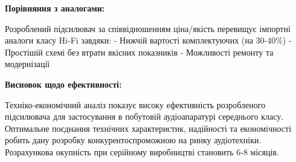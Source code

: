 \documentclass[main.tex]{subfiles}
\begin{document}
\textbf{Порівняння з аналогами:}

Розроблений підсилювач за співвідношенням ціна/якість перевищує імпортні аналоги класу Hi-Fi завдяки:
- Нижчій вартості комплектуючих (на 30-40\%)
- Простішій схемі без втрати якісних показників
- Можливості ремонту та модернізації

\textbf{Висновок щодо ефективності:}

Техніко-економічний аналіз показує високу ефективність розробленого підсилювача для застосування в побутовій аудіоапаратурі середнього класу. Оптимальне поєднання технічних характеристик, надійності та економічності робить дану розробку конкурентоспроможною на ринку аудіотехніки. Розрахункова окупність при серійному виробництві становить 6-8 місяців.
\end{document}
